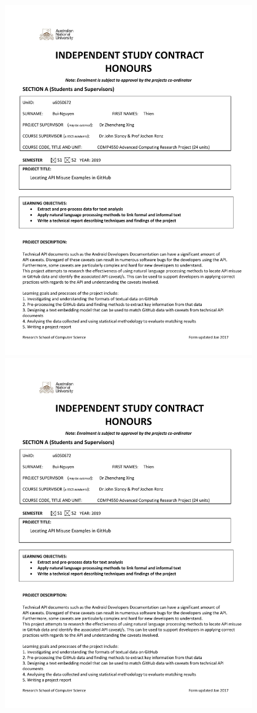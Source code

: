 \centering
\includegraphics[page=1,width=0.8\textwidth]{figs/study-contract.pdf} \newpage
\includegraphics[page=2,width=0.8\textwidth]{figs/study-contract.pdf} \newpage

